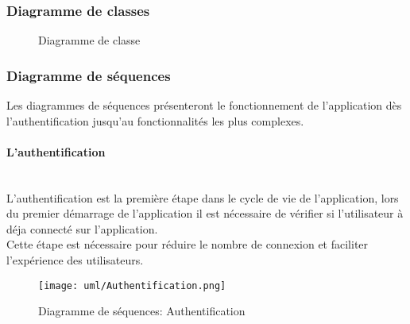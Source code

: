 \subsubsection{Diagramme de classes}
\begin{figure}[H]
    \centering
    \vspace{1cm}
    \caption{Diagramme de classe}
    \label{fig:class_diag}
\end{figure}
\subsubsection{Diagramme de séquences}
Les diagrammes de séquences présenteront le fonctionnement de l'application dès l'authentification jusqu'au fonctionnalités les plus complexes.
\paragraph{L'authentification}\mbox{} \\
L'authentification est la première étape dans le cycle de vie de l'application, lors du premier démarrage de l'application il est nécessaire de vérifier si l'utilisateur à déja connecté sur l'application.\\
\noindent Cette étape est nécessaire pour réduire le nombre de connexion et faciliter l'expérience des utilisateurs.
\vspace{1cm}
\begin{figure}[H]
    \centering
    \texttt{[image: uml/Authentification.png]}
    \vspace{1cm}
    \caption{Diagramme de séquences: Authentification}
    \label{fig:seq_auth}
\end{figure}
